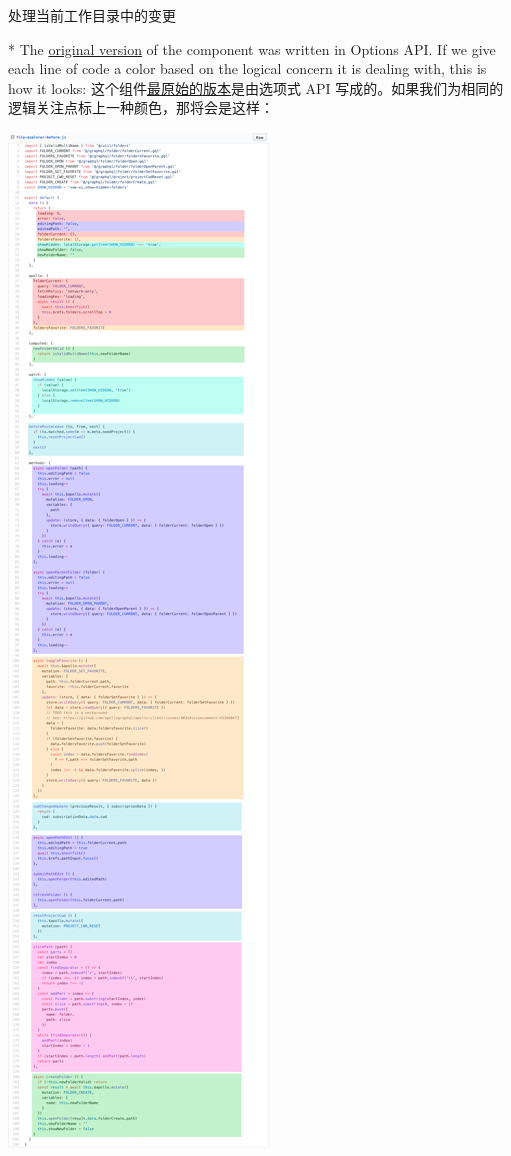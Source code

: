 \begin{paracol}{2}
\begin{itemize}
  处理当前工作目录中的变更
\end{itemize}
\switchcolumn[0]*%
The
\href{https://github.com/vuejs/vue-cli/blob/a09407dd5b9f18ace7501ddb603b95e31d6d93c0/packages/@vue/cli-ui/src/components/folder/FolderExplorer.vue\#L198-L404}{original
version} of the component was written in Options API. If we give each
line of code a color based on the logical concern it is dealing with,
this is how it looks:
\switchcolumn
这个组件\href{https://github.com/vuejs/vue-cli/blob/a09407dd5b9f18ace7501ddb603b95e31d6d93c0/packages/@vue/cli-ui/src/components/folder/FolderExplorer.vue\#L198-L404}{最原始的版本}是由选项式
API 写成的。如果我们为相同的逻辑关注点标上一种颜色，那将会是这样：
\end{paracol}

\begin{center} 
\includegraphics{./img/62783021-7ce24400-ba89-11e9-9dd3-36f4f6b1fae2.png} 

\end{center}

